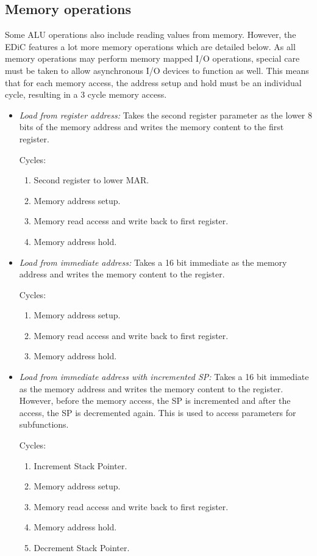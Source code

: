 \subsection{Memory operations} Some \gls{ALU} operations also include reading values from memory.
However, the \gls{EDiC} features a lot more memory operations which are detailed below.
As all memory operations may perform memory mapped I/O operations, special care must be taken to allow asynchronous I/O devices to function as well.
This means that for each memory access, the address setup and hold must be an individual cycle, resulting in a 3 cycle memory access.
\begin{itemize}
  \item \emph{Load from register address:} Takes the second register parameter as the lower 8 bits of the memory address and writes the memory content to the first register.

  Cycles:
  \begin{enumerate}
    \item Second register to lower \gls{MAR}.
    \item Memory address setup.
    \item Memory read access and write back to first register.
    \item Memory address hold.
  \end{enumerate}

  \item \emph{Load from immediate address:} Takes a 16 bit immediate as the memory address and writes the memory content to the register.

  Cycles:
  \begin{enumerate}
    \item Memory address setup.
    \item Memory read access and write back to first register.
    \item Memory address hold.
  \end{enumerate}

  \item \emph{Load from immediate address with incremented \gls{SP}:} Takes a 16 bit immediate as the memory address and writes the memory content to the register.
  However, before the memory access, the \gls{SP} is incremented and after the access, the \gls{SP} is decremented again.
  This is used to access parameters for subfunctions.

  Cycles:
  \begin{enumerate}
    \item Increment Stack Pointer.
    \item Memory address setup.
    \item Memory read access and write back to first register.
    \item Memory address hold.
    \item Decrement Stack Pointer.
  \end{enumerate}


\end{itemize}
